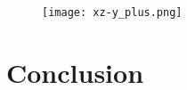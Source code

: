 \documentclass[11pt,a4paper]{article}
\begin{document}
\begin{center}
\begin{figure}[htbp] %
\label{figure.B-field}
\texttt{[image: xz-y\_plus.png]}
\caption{}
\end{figure}
\end{center}



\section{Conclusion}
\end{document}
